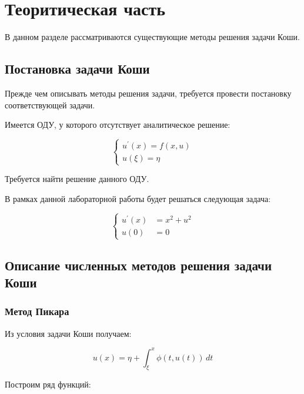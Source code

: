\chapter{Теоритическая часть}

В данном разделе рассматриваются существующие методы решения задачи Коши.

\section{Постановка задачи Коши}

Прежде чем описывать методы решения задачи, требуется провести постановку соответствующей задачи.

Имеется ОДУ, у которого отсутствует аналитическое решение:

\begin{equation}
    \label{eq:initial_odu}
    \begin{cases}
        u^{\prime}(x) = f(x, u)\\
        u(\xi) = \eta
    \end{cases}
\end{equation}

Требуется найти решение данного ОДУ.

В рамках данной лабораторной работы будет решаться следующая задача:

\begin{equation}
    \label{eq:cauchy_problem}
    \begin{cases}
        u^{\prime}(x) &= x^2 + u^2\\
        u(0) &= 0
    \end{cases}
\end{equation}

\section{Описание численных методов решения задачи Коши}

\subsection{Метод Пикара}

Из условия задачи Коши получаем:

\begin{equation}
    \label{eq:picar_solution}
    u(x) = \eta +  \int_{\xi}^{x} \phi(t,u(t)) \,dt
\end{equation}

Построим ряд функций:

